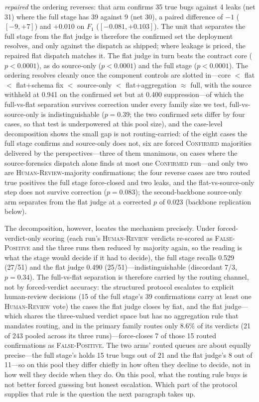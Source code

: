 \documentclass[acmsmall,screen,review,anonymous]{acmart}
\begin{document}
\emph{repaired} the ordering reverses: that arm confirms 35 true bugs against 4 leaks (net 31) where the full stage has 39 against 9 (net 30), a paired difference of $-1$ ($[-9, +7]$) and $+0.010$ on $F_1$ ($[-0.081, +0.103]$). The unit that separates the full stage from the flat judge is therefore the confirmed set the deployment resolves, and only against the dispatch as shipped; where leakage is priced, the repaired flat dispatch matches it. The flat judge in turn beats the contract core ($p{<}0.0001$), as do source-only ($p{<}0.0001$) and the full stage ($p{<}0.0001$). The ordering resolves cleanly once the component controls are slotted in---core $<$ flat $<$ flat$+$schema fix $<$ source-only $<$ flat$+$aggregation $\approx$ full, with the source withheld at 0.941 on the confirmed set but at 0.400 suppression---of which the full-vs-flat separation survives correction under every family size we test, full-vs-source-only is indistinguishable ($p{=}0.39$; the two confirmed sets differ by four cases, so that test is underpowered at this pool size), and the case-level decomposition shows the small gap is not routing-carried: of the eight cases the full stage confirms and source-only does not, six are forced \textsc{Confirmed} majorities delivered by the perspectives---three of them unanimous, on cases where the source-forensics dispatch alone finds at most one \textsc{Confirmed} run---and only two are \textsc{Human-Review}-majority confirmations; the four reverse cases are two routed true positives the full stage force-closed and two leaks, and the flat-vs-source-only step does not survive correction ($p{=}0.083$); the second-backbone source-only arm separates from the flat judge at a corrected $p$ of 0.023 (backbone replication below).

The decomposition, however, locates the mechanism precisely. Under forced-verdict-only scoring (each run's \textsc{Human-Review} verdicts re-scored as \textsc{False-Positive} and the three runs then reduced by majority again, so the reading is what the stage would decide if it had to decide), the full stage recalls 0.529 (27/51) and the flat judge 0.490 (25/51)---indistinguishable (discordant 7/3, $p{=}0.34$). The full-vs-flat separation is therefore carried by the routing channel, not by forced-verdict accuracy: the structured protocol escalates to explicit human-review decisions (15 of the full stage's 39 confirmations carry at least one \textsc{Human-Review} vote) the cases the flat judge closes by fiat, and the flat judge---which shares the three-valued verdict space but has no aggregation rule that mandates routing, and in the primary family routes only 8.6\% of its verdicts (21 of 243 pooled across its three runs)---force-closes 7 of those 15 routed confirmations as \textsc{False-Positive}. The two arms' routed queues are about equally precise---the full stage's holds 15 true bugs out of 21 and the flat judge's 8 out of 11---so on this pool they differ chiefly in how often they decline to decide, not in how well they decide when they do. On this pool, what the routing rule buys is not better forced guessing but honest escalation. Which part of the protocol supplies that rule is the question the next paragraph takes up.
\end{document}
